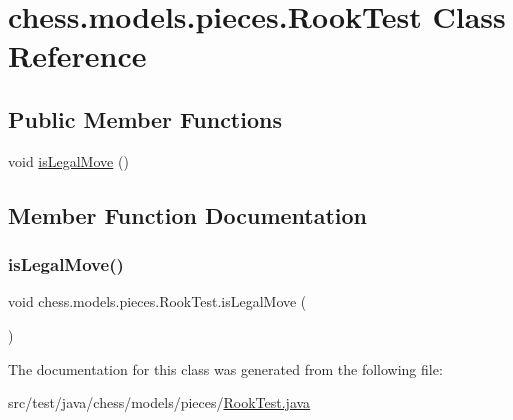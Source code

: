 \hypertarget{classchess_1_1models_1_1pieces_1_1_rook_test}{}\section{chess.\+models.\+pieces.\+Rook\+Test Class Reference}
\label{classchess_1_1models_1_1pieces_1_1_rook_test}
\subsection*{Public Member Functions}
\begin{DoxyCompactItemize}
\item 
void \mbox{\hyperlink{classchess_1_1models_1_1pieces_1_1_rook_test_a3c56b66f7159677ac04305b4029c58ca}{is\+Legal\+Move}} ()
\end{DoxyCompactItemize}


\subsection{Member Function Documentation}
\mbox{\label{classchess_1_1models_1_1pieces_1_1_rook_test_a3c56b66f7159677ac04305b4029c58ca}} 
\subsubsection{\texorpdfstring{is\+Legal\+Move()}{isLegalMove()}}
{\footnotesize\ttfamily void chess.\+models.\+pieces.\+Rook\+Test.\+is\+Legal\+Move (\begin{DoxyParamCaption}{ }\end{DoxyParamCaption})}



The documentation for this class was generated from the following file\+:\begin{DoxyCompactItemize}
\item 
src/test/java/chess/models/pieces/\mbox{\hyperlink{_rook_test_8java}{Rook\+Test.\+java}}\end{DoxyCompactItemize}
